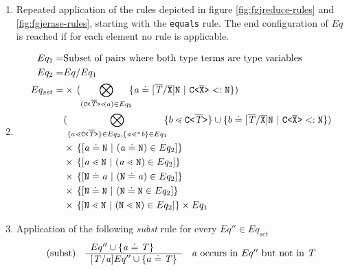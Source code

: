 \begin{enumerate}
\item Repeated application of the rules depicted in figure \ref{fig:fgjreduce-rules} and \ref{fig:fgjerase-rules},
starting with the \texttt{equals} rule.
The end configuration of $Eq$ is reached if for each element no rule is applicable.
\item
\begin{align*}
Eq_1 =& \text{Subset of pairs where both type terms are type variables}\\
Eq_2 =& Eq / Eq_1 \\
Eq_{set}
    = 
    & \times\, 
    (\displaystyle{\bigotimes_{(\exptype{C}{\overline{\itype{T}}} \lessdot   \tv{a}) \in Eq_2}}\!\!
    \set{\tv{a} \doteq [\overline{\itype{T}}/\ol{X}]\type{N} \ | \ \exptype{C}{\overline{\type{X}}} <: \type{N} })\\
    & (\displaystyle{\bigotimes_{\set{a \lessdot \exptype{C}{\overline{\itype{T}}}} \in Eq_2, \set{ \tv{a} \lessdot^* \tv{b}} \in Eq_1}}\!\!
    \set{ b \lessdot \exptype{C}{\ol{\itype{T}}}} \cup \set{b \doteq [\ol{\itype{T}}/\ol{X}]\type{N} \ | \ \exptype{C}{\overline{X}} <: \type{N} })\\
    & \times\, \set{[\tv{a} \doteq \type{N} \ | \  (\tv{a} \doteq \type{N}) \in Eq_2]} \\
    & \times\, \set{[\tv{a} \lessdot \type{N} \ | \  (\tv{a} \lessdot \type{N}) \in Eq_2]}  \\
    & \times\, \set{[\type{N} \doteq \tv{a} \ | \  (\type{N} \doteq \tv{a}) \in Eq_2]}  \\
    & \times\, \set{[\type{N} \doteq \type{N} \ | \  (\type{N} \doteq \type{N} \in Eq_2]} \\
    & \times\, \set{[\type{N} \lessdot \type{N} \ | \  (\type{N} \lessdot \type{N}) \in Eq_2]} \times Eq_1 \\
\end{align*}
\item \label{subst-step}  Application of the following \emph{subst} rule for every $Eq'' \in Eq_{set}$
      $$\begin{array}[c]{lll}
        (\mathrm{subst}) &
        \begin{array}[c]{l}
          Eq'' \cup \{ \mathit{ a } \doteq \mathit{T} \}\\
          \hline
          [\mathit{T}/\mathit{ a }]Eq'' \cup \{ a \doteq \mathit{T} \}
        \end{array}
        & \mathit{ a } \textrm{ occurs in } Eq'' \textrm{ but not in } \mathit{T}
      \end{array}$$
      

\end{enumerate}
